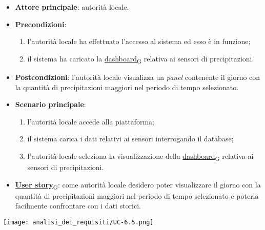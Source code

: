 \begin{itemize}
	\item \textbf{Attore principale}: autorità locale.
	\item \textbf{Precondizioni}:
	      \begin{enumerate}
		      \item l'autorità locale ha effettuato l'accesso al sistema ed esso è in funzione;
		      \item il sistema ha caricato la \href{https://7last.github.io/docs/rtb/documentazione-interna/glossario\#dashboard}{dashboard\textsubscript{G}} relativa ai sensori di precipitazioni.
	      \end{enumerate}
	\item \textbf{Postcondizioni}: l'autorità locale visualizza un \textit{panel} contenente il giorno con la quantità di precipitazioni maggiori nel periodo di tempo selezionato.
	\item \textbf{Scenario principale}:
	      \begin{enumerate}
		      \item l'autorità locale accede alla piattaforma;
		      \item il sistema carica i dati relativi ai sensori interrogando il database;
		      \item l'autorità locale seleziona la visualizzazione della \href{https://7last.github.io/docs/rtb/documentazione-interna/glossario\#dashboard}{dashboard\textsubscript{G}} relativa ai sensori di precipitazioni.
	      \end{enumerate}
	\item \href{https://7last.github.io/docs/rtb/documentazione-interna/glossario\#user-story}{\textbf{User story}\textsubscript{G}}:
	      come autorità locale desidero poter visualizzare il giorno con la quantità di precipitazioni maggiori nel periodo di tempo selezionato
	      e poterla facilmente confrontare con i dati storici.
\end{itemize}
\begin{center}
	\texttt{[image: analisi\_dei\_requisiti/UC-6.5.png]}
\end{center}

\newpage

